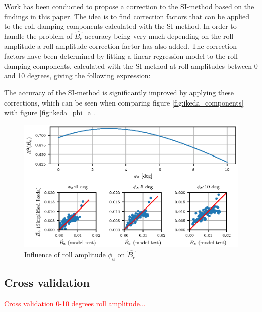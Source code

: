 Work has been conducted to propose a correction to the SI-method based on the findings in this paper. The idea is to find correction factors that can be applied to the roll damping components calculated with the SI-method. In order to handle the problem of $\hat{B_e}$ accuracy being very much depending on the roll amplitude a roll amplitude correction factor has also added. The correction factors have been determined by fitting a linear regression model to the roll damping components, calculated with the SI-method at roll amplitudes between 0 and 10 degrees, giving the following expression: 

The accuracy of the SI-method is significantly improved by applying these corrections, which can be seen when comparing figure \ref{fig:ikeda_components} with figure \ref{fig:ikeda_phi_a}. 

\begin{figure}[H]
\vspace{-0.5cm}
\centering
  \centering
  \includegraphics[]{figures/ikeda_corrected_phi_a.eps}
  \vspace{-0.5cm}
  \caption{Influence of roll amplitude $\phi_a$ on $\hat{B_e}$}
  \label{fig:ikeda_phi_a_correction}
\end{figure}

\subsection{Cross validation}
\textcolor{red}{Cross validation 0-10 degrees roll amplitude...}

